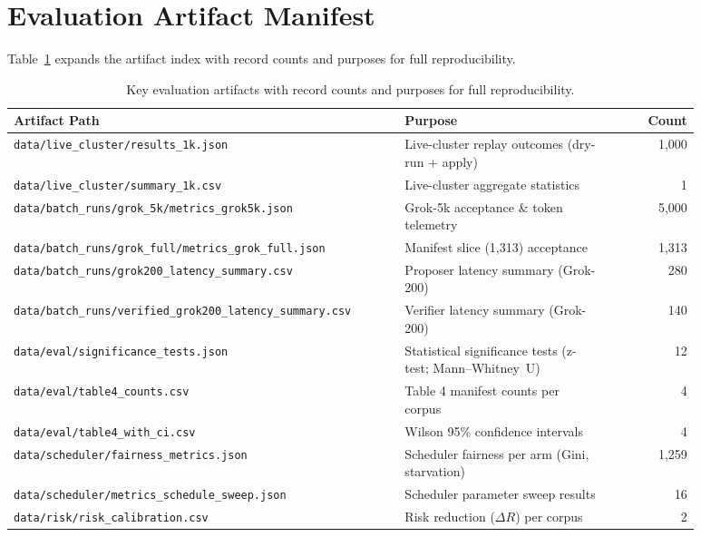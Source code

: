 \documentclass[10pt]{article}
\begin{document}
\section{Evaluation Artifact Manifest}
\label{app:artifact_manifest}
\noindent Table~\ref{tab:artifact_manifest} expands the artifact index with record counts and purposes for full reproducibility.
\begin{table}[H]
\centering
\small
\caption{Key evaluation artifacts with record counts and purposes for full reproducibility.}
\label{tab:artifact_manifest}
\begin{tabularx}{\linewidth}{@{}>{\ttfamily\raggedright\arraybackslash}p{0.58\linewidth} >{\raggedright\arraybackslash}p{0.30\linewidth} r@{}}
\toprule
\textbf{Artifact Path} & \textbf{Purpose} & \textbf{Count} \\
\midrule
\texttt{data/live\_cluster/results\_1k.json} & Live-cluster replay outcomes (dry-run + apply) & 1{,}000 \\
\texttt{data/live\_cluster/summary\_1k.csv} & Live-cluster aggregate statistics & 1 \\
\texttt{data/batch\_runs/grok\_5k/metrics\_grok5k.json} & Grok-5k acceptance \& token telemetry & 5{,}000 \\
\texttt{data/batch\_runs/grok\_full/metrics\_grok\_full.json} & Manifest slice (1{,}313) acceptance & 1{,}313 \\
\texttt{data/batch\_runs/grok200\_latency\_summary.csv} & Proposer latency summary (Grok-200) & 280 \\
\texttt{data/batch\_runs/verified\_grok200\_latency\_summary.csv} & Verifier latency summary (Grok-200) & 140 \\
\texttt{data/eval/significance\_tests.json} & Statistical significance tests (z-test; Mann--Whitney~U) & 12 \\
\texttt{data/eval/table4\_counts.csv} & Table 4 manifest counts per corpus & 4 \\
\texttt{data/eval/table4\_with\_ci.csv} & Wilson 95\% confidence intervals & 4 \\
\texttt{data/scheduler/fairness\_metrics.json} & Scheduler fairness per arm (Gini, starvation) & 1{,}259 \\
\texttt{data/scheduler/metrics\_schedule\_sweep.json} & Scheduler parameter sweep results & 16 \\
\texttt{data/risk/risk\_calibration.csv} & Risk reduction ($\Delta R$) per corpus & 2 \\
\bottomrule
\end{tabularx}
\end{table}
\end{document}
